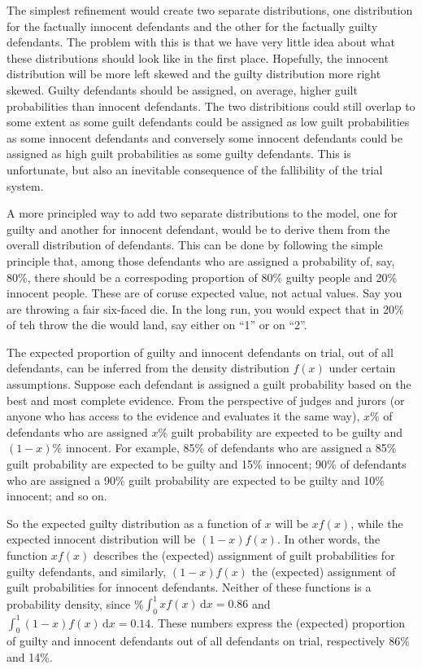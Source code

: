 \documentclass[10pt,dvipsnames,enabledeprecatedfontcommands]{scrartcl}
\begin{document}
The simplest refinement would create two separate distributions, one
distribution for the factually innocent defendants and the other for the
factually guilty defendants. The problem with this is that we have very
little idea about what these distributions should look like in the first
place. Hopefully, the innocent distribution will be more left skewed and
the guilty distribution more right skewed. Guilty defendants should be
assigned, on average, higher guilt probabilities than innocent
defendants. The two distribitions could still overlap to some extent as
some guilt defendants could be assigned as low guilt probabilities as
some innocent defendants and conversely some innocent defendants could
be assigned as high guilt probabilities as some guilty defendants. This
is unfortunate, but also an inevitable consequence of the fallibility of
the trial system.

A more principled way to add two separate distributions to the model,
one for guilty and another for innocent defendant, would be to derive
them from the overall distribution of defendants. This can be done by
following the simple principle that, among those defendants who are
assigned a probability of, say, 80\%, there should be a correspoding
proportion of 80\% guilty people and 20\% innocent people. These are of
coruse expected value, not actual values. Say you are throwing a fair
six-faced die. In the long run, you would expect that in 20\% of teh
throw the die would land, say either on ``1'' or on ``2''.

The expected proportion of guilty and innocent defendants on trial, out
of all defendants, can be inferred from the density distribution
\(f(x)\) under certain assumptions. Suppose each defendant is assigned a
guilt probability based on the best and most complete evidence. From the
perspective of judges and jurors (or anyone who has access to the
evidence and evaluates it the same way), \(x\%\) of defendants who are
assigned \(x\%\) guilt probability are expected to be guilty and
\((1-x)\%\) innocent. For example, 85\% of defendants who are assigned a
85\% guilt probability are expected to be guilty and 15\% innocent; 90\%
of defendants who are assigned a 90\% guilt probability are expected to
be guilty and 10\% innocent; and so on.

So the expected guilty distribution as a function of \(x\) will be
\(x f(x)\), while the expected innocent distribution will be
\((1-x)f(x)\). In other words, the function \(xf(x)\) describes the
(expected) assignment of guilt probabilities for guilty defendants, and
similarly, \((1-x)f(x)\) the (expected) assignment of guilt
probabilities for innocent defendants. Neither of these functions is a
probability density, since \%\(\int_0^1 \! xf(x) \, \mathrm{d}x=0.86\)
and \(\int_0^1 \! (1-x)f(x) \, \mathrm{d}x=0.14\). These numbers express
the (expected) proportion of guilty and innocent defendants out of all
defendants on trial, respectively 86\% and 14\%.
\end{document}
